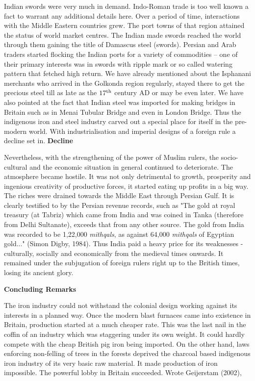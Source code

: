 Indian swords were very much in demand. Indo-Roman trade is too well known a fact to warrant any additional details here. Over a period of time, interactions with the Middle Eastern countries grew. The port towns of that region attained the status of world market centres. The Indian made swords reached the world through them gaining the title of Damascus steel (swords). Persian and Arab traders started flocking the Indian ports for a variety of commodities – one of their primary interests was in swords with ripple mark or so called watering pattern that fetched high return. We have already mentioned about the Isphanani merchants who arrived in the Golkonda region regularly, stayed there to get the precious steel till as late as the $17^{\rm th}$ century AD or may be even later. We have also pointed at the fact that Indian steel was imported for making bridges in Britain such as in Menai Tubular Bridge and even in London Bridge. Thus the indigenous iron and steel industry carved out a special place for itself in the pre-modern world. With industrialisation and imperial designs of a foreign rule a decline set in.  
\newpage
\noindent \textbf{\large Decline}

Nevertheless, with the strengthening of the power of Muslim rulers, the socio-cultural and the economic situation in general continued to deteriorate. The atmosphere became hostile. It was not only detrimental to growth, prosperity and ingenious creativity of productive forces, it started eating up profits in a big way. The riches were drained towards the Middle East through Persian Gulf. It is clearly testified to by the Persian revenue records, such as "The gold at royal treasury (at Tabriz) which came from India and was coined in Tanka (therefore from Delhi Sultanate), exceeds that from any other source. The gold from India was recorded to be 1,22,000 {\it mithqals}, as against 64,000 {\it mithqals} of Egyptian gold..." (Simon Digby, 1984). Thus India paid a heavy price for its weaknesses - culturally, socially and economically from the medieval times onwards. It remained under the subjugation of foreign rulers right up to the British times, losing its ancient glory.

\noindent \textbf{\large Concluding Remarks}

The iron industry could not withstand the colonial design working against its interests in a planned way. Once the modern blast furnaces came into existence in Britain, production started at a much cheaper rate. This was the last nail in the coffin of an industry which was staggering under its own weight. It could hardly compete with the cheap British pig iron being imported. On the other hand, laws enforcing non-felling of trees in the forests deprived the charcoal based indigenous iron industry of its very basic raw material. It made production of iron impossible. The powerful lobby in Britain succeeded. Wrote Geijerstam (2002),


